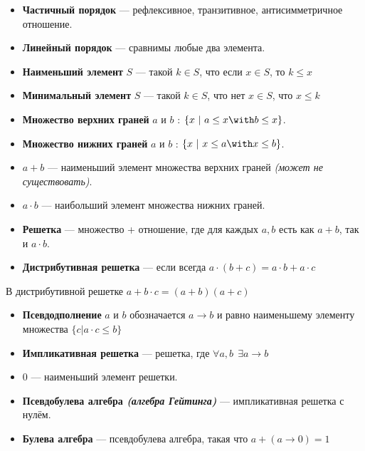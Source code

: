 \documentclass[12pt, a4paper, oneside]{book}
\begin{document}
\begin{definition}\itemfix
    \begin{itemize}
        \item \textbf{Частичный порядок} --- рефлексивное, транзитивное, антисимметричное отношение.
        \item \textbf{Линейный порядок} --- сравнимы любые два элемента.
        \item \textbf{Наименьший элемент} \(S\) --- такой \(k\in S\), что если \(x\in S\), то \(k \leq x\)
        \item \textbf{Минимальный элемент} \(S\) --- такой \(k\in S\), что нет \(x\in S\), что \(x \leq k\)
        \item \textbf{Множество верхних граней} \(a\) и \(b\) : \(\{x\ |\ a \leq x \with b \leq x\}\).
        \item \textbf{Множество нижних граней} \(a\) и \(b\) : \(\{x\ |\ x \leq a \with x \leq b\}\).
        \item \(a + b\) --- наименьший элемент множества верхних граней \textit{(может не существовать)}.
        \item \(a \cdot b\) --- наибольший элемент множества нижних граней.
        \item \textbf{Решетка} --- множество + отношение, где для каждых \(a,b\) есть как \(a + b\), так и \(a \cdot b\).
        \item \textbf{Дистрибутивная решетка} --- если всегда \(a\cdot(b + c) = a\cdot b + a\cdot c\)
    \end{itemize}
\end{definition}

\begin{lemma}
    В дистрибутивной решетке \(a + b\cdot c = (a + b)(a + c)\)
\end{lemma}

\begin{definition}\itemfix
    \begin{itemize}
        \item \textbf{Псевдодполнение} \(a\) и \(b\) обозначается \(a \to b\) и равно наименьшему элементу множества \(\{c | a\cdot c \leq b\}\)
        \item \textbf{Импликативная решетка} --- решетка, где \(\forall a, b \ \ \exists a \to b\)
        \item \(0\) --- наименьший элемент решетки.
        \item \textbf{Псевдобулева алгебра \textit{(алгебра Гейтинга)}} --- импликативная решетка с нулём.
        \item \textbf{Булева алгебра} --- псевдобулева алгебра, такая что \(a + (a \to 0) = 1\)
    \end{itemize}
\end{definition}
\end{document}
